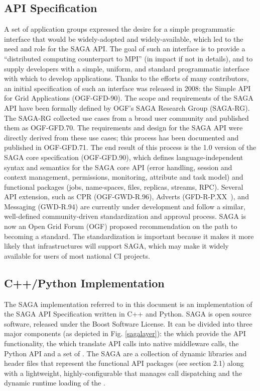\subsection{API Specification}	
A set of application groups expressed the desire for a 
simple programmatic interface that would be widely-adopted and widely-available,
which led to the need and role for the SAGA API. 
The goal of such an interface is to provide a ``distributed computing 
counterpart to MPI'' (in impact if not in details), 
and to supply developers with
a simple, uniform, and standard programmatic interface with which to
develop applications.  Thanks to the efforts of many contributors, an initial 
specification of such an interface was released in 2008: the Simple API for Grid
Applications (OGF-GFD-90). The scope and requirements of
the SAGA API have been formally defined by OGF's SAGA Research Group
(SAGA-RG). The SAGA-RG collected use cases from a broad user
community and published them as OGF-GFD.70. The
requirements and design for the SAGA API were directly derived from
these use cases; this process has been documented and published in
OGF-GFD.71. The end result of this process is the 1.0
version of the SAGA core specification (OGF-GFD.90),
which defines language-independent syntax and semantics for the SAGA
core API (error handling, session and context management, permissions,
monitoring, attribute and task model) and functional packages (jobs,
name-spaces, files, replicas, streams, RPC). Several API extension,
such as CPR (OGF-GWD-R.96), Adverts
(GFD-R-P.XX~), and Messaging (GWD-R.94) are currently under development and
follow a similar, well-defined community-driven standardization and
approval process. SAGA is now an Open Grid Forum (OGF)
proposed recommendation on the path to becoming a standard.  The
standardization is important because
it makes it more likely that infrastructures will support
SAGA, which may make it widely available for users of
most national CI projects.
	
\subsection{C++/Python Implementation}
The SAGA implementation referred to in this 
document is an implementation of the SAGA API Specification written in C++ 
and Python. SAGA is open source software, released under the Boost Software
License. It can be divided into three major components (as depicted in Fig. \ref{sagalayer}): the  which provide the API functionality, the 
which translate API calls into native middleware calls, the Python API
 and a set of . The SAGA
 are a collection of dynamic libraries and header
files that represent the functional API packages (see section 2.1)
along with a lightweight, highly-configurable 
that manages call dispatching and the dynamic runtime loading of the
.

